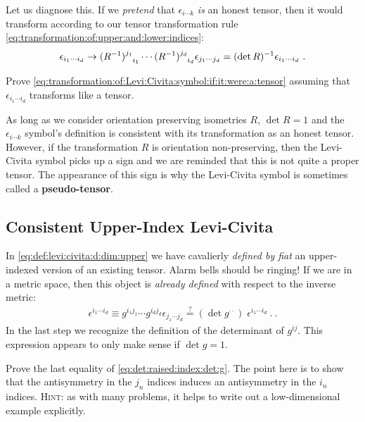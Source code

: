\documentclass[12pt, oneside]{report}    %
\begin{document}
\begin{subappendices}
Let us diagnose this. If we \emph{pretend} that $\epsilon_{i\cdots k}$ \emph{is} an honest tensor, then it would transform according to our tensor transformation rule \eqref{eq:transformation:of:upper:and:lower:indices}:
\begin{align}
    \epsilon_{i_1\cdots i_d} \to 
    (R\inv)\aij{j_1}{i_1}\cdots
    (R\inv)\aij{j_d}{i_d}
    \epsilon_{j_1 \cdots j_d} 
    =
    (\det R)\inv \epsilon_{i_1\cdots i_d}
    \label{eq:transformation:of:Levi:Civita:symbol:if:it:were:a:tensor}
    \ .
\end{align}
\begin{exercise}
Prove \eqref{eq:transformation:of:Levi:Civita:symbol:if:it:were:a:tensor} assuming that $\epsilon_{i_1\cdots i_d}$ transforms like a tensor.
\end{exercise}
As long as we consider orientation preserving isometries $R$, $\det R =1$ and the $\epsilon_{i \cdots k}$ symbol's definition is consistent with its transformation as an honest tensor. However, if the transformation $R$ is orientation non-preserving, then the Levi-Civita symbol picks up a sign and we are reminded that this is not quite a proper tensor. The appearance of this sign is why the Levi-Civita symbol is sometimes called a \textbf{pseudo-tensor}.

\subsection{Consistent Upper-Index Levi-Civita}
In \eqref{eq:def:levi:civita:d:dim:upper} we have cavalierly \emph{defined by fiat} an upper-indexed version of an existing tensor. Alarm bells should be ringing! If we are in a metric space, then this object is \emph{already defined} with respect to the inverse metric:
\begin{align}
    \epsilon^{i_1\cdots i_d}
    \equiv
    g^{i_1j_1}
    \cdots
    g^{i_dj_d}
    \epsilon_{j_1\cdots j_d}
    \stackrel{?}{=}
    (\det g^{\cdot\cdot}) \;
    \epsilon^{i_1\cdots i_d} \ .
    \label{eq:det:raised:index:det:g}
     \ .
\end{align}
In the last step we recognize the definition of the determinant of $g^{ij}$. This expression appears to only make sense if $\det g = 1$.
\begin{exercise}
Prove the last equality of \eqref{eq:det:raised:index:det:g}. The point here is to show that the antisymmetry in the $j_n$ indices induces an antisymmetry in the $i_n$ indices. \textsc{Hint}: as with many problems, it helps to write out a low-dimensional example explicitly.
\end{exercise}


\end{subappendices}
\end{document}
